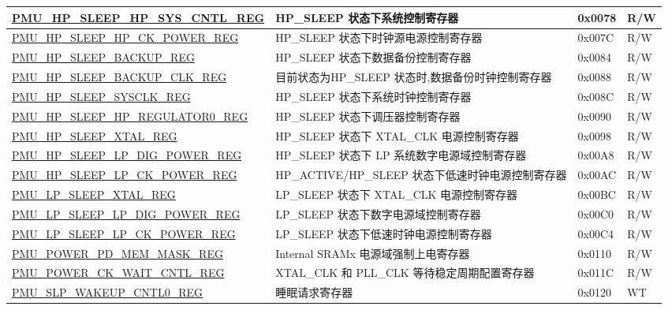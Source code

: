 \begin{longtable}{ | l | L{6cm} | l | l | }
\hyperref[regdesc:PMUHPSLEEPHPSYSCNTLREG]{PMU\_HP\_SLEEP\_HP\_SYS\_CNTL\_REG} & HP\_SLEEP 状态下系统控制寄存器 & 0x0078 & R/W \\ \hline
\hyperref[regdesc:PMUHPSLEEPHPCKPOWERREG]{PMU\_HP\_SLEEP\_HP\_CK\_POWER\_REG} & HP\_SLEEP 状态下时钟源电源控制寄存器 & 0x007C & R/W \\ \hline
\hyperref[regdesc:PMUHPSLEEPBACKUPREG]{PMU\_HP\_SLEEP\_BACKUP\_REG} & HP\_SLEEP 状态下数据备份控制寄存器 & 0x0084 & R/W \\ \hline
\hyperref[regdesc:PMUHPSLEEPBACKUPCLKREG]{PMU\_HP\_SLEEP\_BACKUP\_CLK\_REG} & 目前状态为HP\_SLEEP 状态时,数据备份时钟控制寄存器 & 0x0088 & R/W \\ \hline
\hyperref[regdesc:PMUHPSLEEPSYSCLKREG]{PMU\_HP\_SLEEP\_SYSCLK\_REG} & HP\_SLEEP 状态下系统时钟控制寄存器  & 0x008C & R/W \\ \hline
\hyperref[regdesc:PMUHPSLEEPHPREGULATOR0REG]{PMU\_HP\_SLEEP\_HP\_REGULATOR0\_REG} & HP\_SLEEP 状态下调压器控制寄存器 & 0x0090 & R/W \\ \hline
\hyperref[regdesc:PMUHPSLEEPXTALREG]{PMU\_HP\_SLEEP\_XTAL\_REG} & HP\_SLEEP 状态下 XTAL\_CLK 电源控制寄存器 & 0x0098 & R/W \\ \hline
\hyperref[regdesc:PMUHPSLEEPLPDIGPOWERREG]{PMU\_HP\_SLEEP\_LP\_DIG\_POWER\_REG} &  HP\_SLEEP 状态下 LP 系统数字电源域控制寄存器 & 0x00A8 & R/W \\ \hline
\hyperref[regdesc:PMUHPSLEEPLPCKPOWERREG]{PMU\_HP\_SLEEP\_LP\_CK\_POWER\_REG} & HP\_ACTIVE/HP\_SLEEP 状态下低速时钟电源控制寄存器 & 0x00AC & R/W \\ \hline
\hyperref[regdesc:PMULPSLEEPXTALREG]{PMU\_LP\_SLEEP\_XTAL\_REG} & LP\_SLEEP 状态下 XTAL\_CLK 电源控制寄存器 & 0x00BC & R/W \\ \hline
\hyperref[regdesc:PMULPSLEEPLPDIGPOWERREG]{PMU\_LP\_SLEEP\_LP\_DIG\_POWER\_REG} & LP\_SLEEP 状态下数字电源域控制寄存器 & 0x00C0 & R/W \\ \hline
\hyperref[regdesc:PMULPSLEEPLPCKPOWERREG]{PMU\_LP\_SLEEP\_LP\_CK\_POWER\_REG} & LP\_SLEEP 状态下低速时钟电源控制寄存器 & 0x00C4 & R/W \\ \hline
\hyperref[regdesc:PMUPOWERPDMEMMASKREG]{PMU\_POWER\_PD\_MEM\_MASK\_REG} & Internal SRAMx 电源域强制上电寄存器& 0x0110 & R/W \\ \hline
\hyperref[regdesc:PMUPOWERCKWAITCNTLREG]{PMU\_POWER\_CK\_WAIT\_CNTL\_REG} & XTAL\_CLK 和 PLL\_CLK 等待稳定周期配置寄存器 & 0x011C & R/W \\ \hline
\hyperref[regdesc:PMUSLPWAKEUPCNTL0REG]{PMU\_SLP\_WAKEUP\_CNTL0\_REG} & 睡眠请求寄存器 & 0x0120 & WT \\ \hline

\end{longtable}

